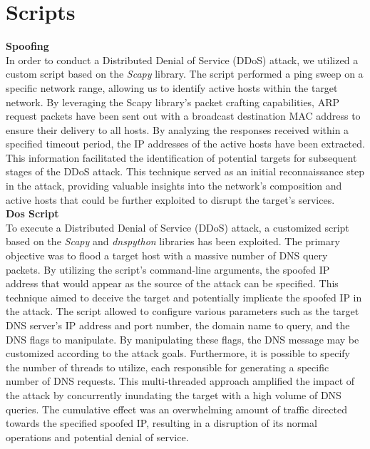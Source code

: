 \section{Scripts}
\textbf{Spoofing}\\
In order to conduct a Distributed Denial of Service (DDoS) attack, we utilized a custom script based on the \textit{Scapy} library. The script performed a ping sweep on a 
specific network range, allowing us to identify active hosts within the target network. By leveraging the Scapy library's packet crafting capabilities,
ARP request packets have been sent out with a broadcast destination MAC address to ensure their delivery to all hosts. By analyzing the responses received 
within a specified timeout period, the IP addresses of the active hosts have been extracted. This information facilitated the identification of potential targets for 
subsequent stages of the DDoS attack. This technique served as an initial reconnaissance step in the attack, providing valuable insights into the 
network's composition and active hosts that could be further exploited to disrupt the target's services.
\\
\textbf{Dos Script}\\
To execute a Distributed Denial of Service (DDoS) attack, a customized script based on the \textit{Scapy} and \textit{dnspython} 
libraries has been exploited. The primary objective 
was to flood a target host with a massive number of DNS query packets. By utilizing the script's command-line arguments, the spoofed 
IP address that would appear as the source of the attack can be specified. This technique aimed to deceive the target and potentially implicate the spoofed IP in 
the attack. The script allowed to configure various parameters such as the target DNS server's IP address and port number, the domain name to 
query, and the DNS flags to manipulate. By manipulating these flags, the DNS message may be customized according to the attack goals. Furthermore, 
it is possible to specify the number of threads to utilize, each responsible for generating a specific number of DNS requests. This multi-threaded approach 
amplified the impact of the attack by concurrently inundating the target with a high volume of DNS queries. The cumulative effect was an overwhelming 
amount of traffic directed towards the specified spoofed IP, resulting in a disruption of its normal operations and potential denial of service.
